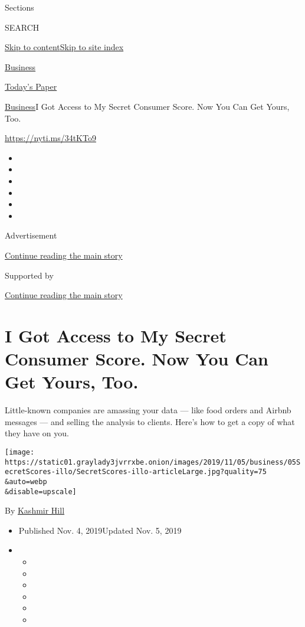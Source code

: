 Sections

SEARCH

\protect\hyperlink{site-content}{Skip to
content}\protect\hyperlink{site-index}{Skip to site index}

\href{https://www.nytimes3xbfgragh.onion/section/business}{Business}

\href{https://myaccount.nytimes3xbfgragh.onion/auth/login?response_type=cookie\&client_id=vi}{}

\href{https://www.nytimes3xbfgragh.onion/section/todayspaper}{Today's
Paper}

\href{/section/business}{Business}\textbar{}I Got Access to My Secret
Consumer Score. Now You Can Get Yours, Too.

\href{https://nyti.ms/34tKTo9}{https://nyti.ms/34tKTo9}

\begin{itemize}
\item
\item
\item
\item
\item
\item
\end{itemize}

Advertisement

\protect\hyperlink{after-top}{Continue reading the main story}

Supported by

\protect\hyperlink{after-sponsor}{Continue reading the main story}

\hypertarget{i-got-access-to-my-secret-consumer-score-now-you-can-get-yours-too}{%
\section{I Got Access to My Secret Consumer Score. Now You Can Get
Yours,
Too.}\label{i-got-access-to-my-secret-consumer-score-now-you-can-get-yours-too}}

Little-known companies are amassing your data --- like food orders and
Airbnb messages --- and selling the analysis to clients. Here's how to
get a copy of what they have on you.

\texttt{[image: https://static01.graylady3jvrrxbe.onion/images/2019/11/05/business/05SecretScores-illo/SecretScores-illo-articleLarge.jpg?quality=75\\\&auto=webp\\\&disable=upscale]}

By \href{https://www.nytimes3xbfgragh.onion/by/kashmir-hill}{Kashmir
Hill}

\begin{itemize}
\item
  Published Nov. 4, 2019Updated Nov. 5, 2019
\item
  \begin{itemize}
  \item
  \item
  \item
  \item
  \item
  \item
  \end{itemize}
\end{itemize}


